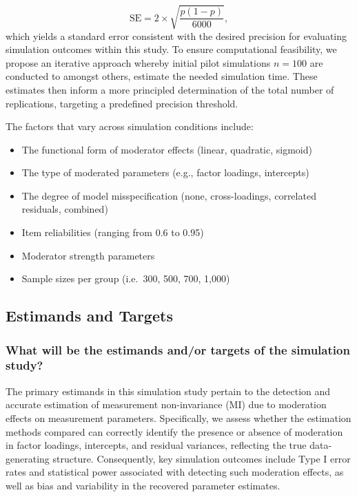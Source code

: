 \documentclass[
  man,
  floatsintext]{apa7}
\providecommand{\tightlist}{%
  \setlength{\itemsep}{0pt}\setlength{\parskip}{0pt}}
\begin{document}
\[
\text{SE} = 2 \times \sqrt{\frac{p(1-p)}{6000}},
\] which yields a standard error consistent with the desired precision
for evaluating simulation outcomes within this study. To ensure
computational feasibility, we propose an iterative approach whereby
initial pilot simulations \(n=100\) are conducted to amongst others,
estimate the needed simulation time. These estimates then inform a more
principled determination of the total number of replications, targeting
a predefined precision threshold.

The factors that vary across simulation conditions include:

\begin{itemize}
\tightlist
\item
  The functional form of moderator effects (linear, quadratic, sigmoid)
\item
  The type of moderated parameters (e.g., factor loadings, intercepts)
\item
  The degree of model misspecification (none, cross-loadings, correlated
  residuals, combined)
\item
  Item reliabilities (ranging from 0.6 to 0.95)
\item
  Moderator strength parameters
\item
  Sample sizes per group (i.e.~300, 500, 700, 1,000)
\end{itemize}

\subsection{Estimands and Targets}\label{estimands-and-targets}

\subsubsection{What will be the estimands and/or targets of the
simulation
study?}\label{what-will-be-the-estimands-andor-targets-of-the-simulation-study}

The primary estimands in this simulation study pertain to the detection
and accurate estimation of measurement non-invariance (MI) due to
moderation effects on measurement parameters. Specifically, we assess
whether the estimation methods compared can correctly identify the
presence or absence of moderation in factor loadings, intercepts, and
residual variances, reflecting the true data-generating structure.
Consequently, key simulation outcomes include Type I error rates and
statistical power associated with detecting such moderation effects, as
well as bias and variability in the recovered parameter estimates.
\end{document}
